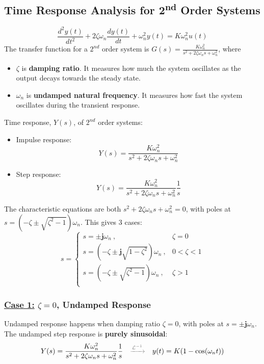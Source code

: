 \subsection{Time Response Analysis for 2\textsuperscript{nd} Order Systems}
\[\frac{d^{2}y(t)}{dt^{2}}+2\zeta\omega_{n}\frac{dy(t)}{dt}+\omega_{n}^{2}y(t) = K\omega_{n}^{2}u(t)\]
The transfer function for a $2^{nd}$ order system is $\displaystyle G(s)= \frac{K\omega_{n}^{2}}{s^{2}+2\zeta\omega_{n}s+\omega_{n}^{2}}$, where
\begin{itemize}
    \item $\zeta$ is \textbf{damping ratio}. It measures how much the system oscillates as the output decays towards the steady state.
    
    \item $\omega_{n}$ is \textbf{undamped natural frequency}. It measures how fast the system oscillates during the transient response.
\end{itemize}
Time response, $Y(s)$, of  $2^{nd}$ order systems:
\begin{itemize}
    \item Impulse response:\[Y(s)= \frac{K\omega_{n}^{2}}{s^{2}+2\zeta\omega_{n}s+\omega_{n}^{2}}\]
    
    \item Step response:\[Y(s)= \frac{K\omega_{n}^{2}}{s^{2}+2\zeta\omega_{n}s+\omega_{n}^{2}}\frac{1}{s}\]
\end{itemize}
The characteristic equations are both $s^{2}+2\zeta\omega_{n}s+\omega_{n}^{2}=0$, with poles at $s = (-\zeta\pm \sqrt{\zeta^{2}-1})\omega_{n}$.
This gives 3 cases: 
    \[
    s=\begin{cases}
    s = \pm\mathbf{j}\omega_{n}\ ,&\zeta = 0\\
    s = (-\zeta\pm \mathbf{j}\sqrt{1-\zeta^{2}})\omega_{n}\ , & 0<\zeta<1\\
    s = (-\zeta\pm \sqrt{\zeta^{2}-1})\omega_{n}\ , &\zeta>1\\
    \end{cases} 
    \]

\subsubsection{\underline{Case 1:} $\zeta = 0$, Undamped Response}
Undamped response happens when damping ratio $\zeta=0$, with poles at $s = \pm \mathbf{j}\omega_{n}$.
The undamped step response is \textbf{purely sinusoidal}:
\[
Y(s) = \frac{K\omega_{n}^{2}}{s^{2}	+2\zeta\omega_{n}s+\omega_{n}^{2}}\frac{1}{s}
\quad  {\color{gray}\xrightarrow{\mathcal{L}^{-1}}} \quad
y(t) = K(1-\cos(\omega_{n}t)) 
\]

